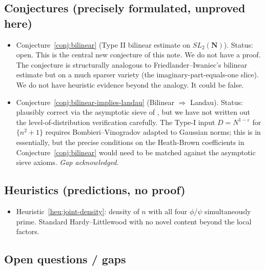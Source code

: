 \documentclass[11pt]{article}
\theoremstyle{definition}
\newcommand{\N}{\mathbf{N}}
\newcommand{\SLN}{SL_2(\N)}
\begin{document}
\subsection*{Conjectures (precisely formulated, unproved here)}

\begin{itemize}
\item Conjecture~\ref{conj:bilinear} (Type II bilinear estimate on $\SLN$). Status: open.
This is the central new conjecture of this note. We do not have a proof. The conjecture
is structurally analogous to Friedlander--Iwaniec's bilinear estimate but on a much
sparser variety (the imaginary-part-equals-one slice). We do not have heuristic evidence
beyond the analogy. It could be false.
\item Conjecture~\ref{conj:bilinear-implies-landau} (Bilinear $\Rightarrow$ Landau).
Status: plausibly correct via the asymptotic sieve of \cite{FI98a}, but we have not
written out the level-of-distribution verification carefully. The Type-I input
$D = N^{1-\varepsilon}$ for $\{n^2+1\}$ requires Bombieri--Vinogradov adapted to Gaussian
norms; this is in \cite[\S 23.4]{FI10} essentially, but the precise conditions on the
Heath-Brown coefficients in Conjecture~\ref{conj:bilinear} would need to be matched
against the asymptotic sieve axioms. \emph{Gap acknowledged.}
\end{itemize}

\subsection*{Heuristics (predictions, no proof)}

\begin{itemize}
\item Heuristic~\ref{heu:joint-density}: density of $n$ with all four $\phi$/$\psi$
simultaneously prime. Standard Hardy--Littlewood with no novel content beyond the local
factors.
\end{itemize}

\subsection*{Open questions / gaps}
\end{document}
